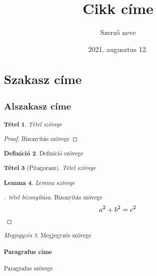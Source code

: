 \documentclass[a4paper,12pt]{article}
\newtheorem{tetel}{Tétel}[section]
\newtheorem{lemma}[tetel]{Lemma}
\theoremstyle{definition}
\newtheorem{defin}[tetel]{Definíció}
\theoremstyle{remark}
\newtheorem{megj}[tetel]{Megjegyzés}
\begin{document}
	\title{Cikk címe}
	\author{Szerző neve}
	\date{2021. augusztus 12.}
	\maketitle
\begin{abstract}
	\hulipsum[1]
	\section{Szakasz címe}
	\subsection{Alszakasz címe}
	\hulipsum
	\begin{tetel}
		Tétel szövege
	\end{tetel}
	\begin{proof}
		Bizonyítás szövege
	\end{proof}
	\begin{defin}
		Definíció szövege
	\end{defin}
	\begin{tetel}[Pitagorasz]\label{tetel-Pitagorasz}
		Tétel szövege
	\end{tetel}
	\begin{lemma}
		Lemma szövege
	\end{lemma}
	\begin{proof}[\Az{\ref{tetel-Pitagorasz}}.~tétel bizonyítása]
		Bizonyítás szövege
		\begin{equation*}
			a^2+b^2=c^2 \qedhere
		\end{equation*}
	\end{proof}
	\begin{megj}
		Megjegyzés szövege
	\end{megj}
	\paragraph{Paragrafus címe} Paragrafus szövege
\end{abstract}
\end{document}

